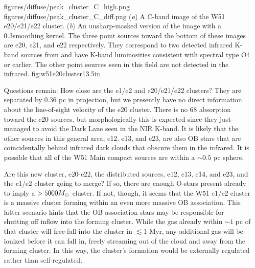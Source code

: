 \FigureTwo
{figures/diffuse/peak_cluster_C_high.png}
{figures/diffuse/peak_cluster_C_diff.png}
{({\it a}) A C-band image of the W51 e20/e21/e22 cluster.
({\it b}) An unsharp-masked version of the image with a 0.3\arcsec smoothing
kernel. 
The three point sources toward the bottom of these images are e20, e21, and e22
respectively.  They correspond to two detected infrared K-band sources from
\citet{Goldader1994a} and have K-band luminosities consistent with spectral
type O4 or earlier.  The other point sources seen in this field are not detected
in the infrared.
}
{fig:w51e20cluster}{1}{3.5in}


Questions remain: %
How close are the e1/e2 and e20/e21/e22 clusters?  They are
separated by 0.36 pc in projection, but we presently have no direct information
about the line-of-sight velocity of the e20 cluster.  There is no 68 \kms
\formaldehyde absorption toward the e20 sources, but morphologically this is
expected since they just managed to avoid the Dark Lane seen in the NIR K-band.  It is
likely that the other sources in this general area, e12, e13, and e23, are also
OB stars that are coincidentally behind infrared dark clouds that obscure them
in the infrared.  It is possible that all of the W51 Main compact sources are
within a $\sim 0.5$ pc sphere.

Are this new cluster, e20-e22, the distributed sources, e12, e13, e14, and e23,
and the e1/e2 cluster going to merge?  If so, there are enough O-stars present
already to imply a $>5000 M_{\odot}$ cluster.  If not, though, it seems that the
W51 e1/e2 cluster is a massive cluster forming within an even more massive OB
association.  This latter scenario hints that the OB association stars may be
responsible for shutting off inflow into the forming cluster.  While the gas
already within $\sim 1$ pc of that cluster will free-fall into the cluster in
$\lesssim 1$ Myr, any additional gas will be ionized before it can fall in,
freely streaming out of the cloud and away from the forming cluster.  In this
way, the cluster's formation would be externally regulated rather than
self-regulated.


